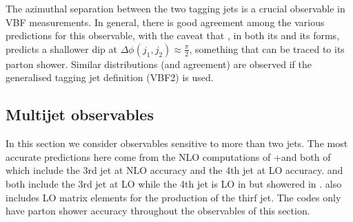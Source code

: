 The azimuthal separation between the two tagging jets is a crucial
observable in VBF measurements. In general, there is good agreement 
among the various predictions for this observable, with the caveat
that \Sherpa, in both its \NNLOPS and its \MEPSatNLO forms, predicts a
shallower dip at $\Delta\phi(j_1,j_2)\approx\tfrac{\pi}{2}$, something
that can be traced to its parton shower. Similar distributions (and
agreement) are observed if the generalised tagging jet definition
(VBF2) is used.




\subsection{Multijet observables}
\label{sec:hjetscomp:results:mjobs}

In this section we consider observables sensitive to more than two jets.
The most accurate predictions here come from the NLO computations of 
\GoSam{}+\Sherpa and \Sherpa \MEPSatNLO both of which include the 3rd 
jet at NLO accuracy and the 4th jet at LO accuracy. \MGaMC and \Herwig 
both include the 3rd jet at LO while the 4th jet is LO in \Herwig but 
showered in \MGaMC. \Hej also includes LO matrix elements for the production 
of the thirf jet. The \NNLOPS codes only have parton shower accuracy 
throughout the observables of this section.


